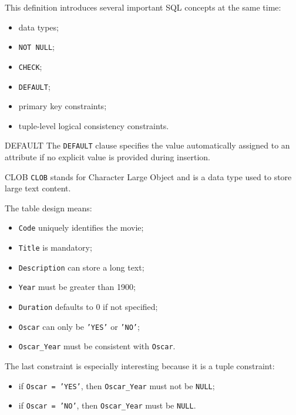  This definition introduces several important SQL concepts at the same time:
 \begin{itemize}
  \item data types;
  \item \texttt{NOT NULL};
  \item \texttt{CHECK};
  \item \texttt{DEFAULT};
  \item primary key constraints;
  \item tuple-level logical consistency constraints.
 \end{itemize}

 \begin{defbox}{DEFAULT}
  The \texttt{DEFAULT} clause specifies the value automatically assigned to an attribute if no explicit value is provided during insertion.
 \end{defbox}

 \begin{defbox}{CLOB}
  \texttt{CLOB} stands for Character Large Object and is a data type used to store large text content.
 \end{defbox}

 The table design means:
 \begin{itemize}
  \item \texttt{Code} uniquely identifies the movie;
  \item \texttt{Title} is mandatory;
  \item \texttt{Description} can store a long text;
  \item \texttt{Year} must be greater than 1900;
  \item \texttt{Duration} defaults to 0 if not specified;
  \item \texttt{Oscar} can only be \texttt{'YES'} or \texttt{'NO'};
  \item \texttt{Oscar\_Year} must be consistent with \texttt{Oscar}.
 \end{itemize}

 The last constraint is especially interesting because it is a tuple constraint:
 \begin{itemize}
  \item if \texttt{Oscar = 'YES'}, then \texttt{Oscar\_Year} must not be \texttt{NULL};
  \item if \texttt{Oscar = 'NO'}, then \texttt{Oscar\_Year} must be \texttt{NULL}.
 \end{itemize}

